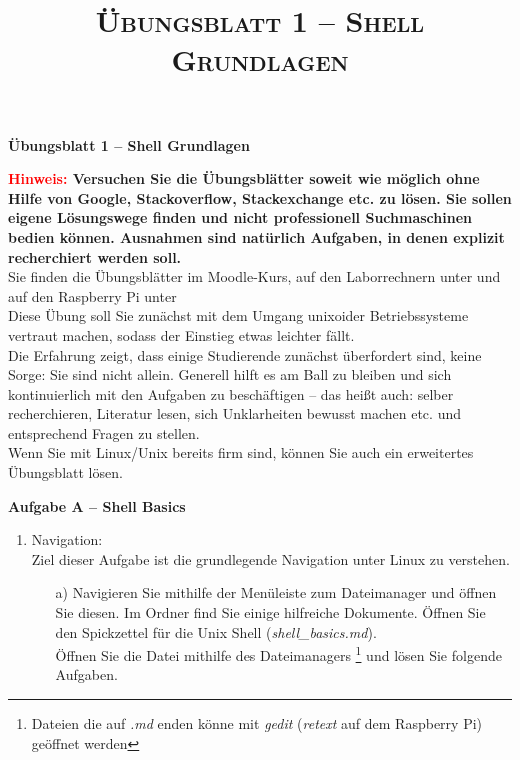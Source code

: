 \documentclass[paper=a4,fontsize=11pt]{scrartcl}%
\title{	
\normalfont \normalsize 
\textsc{Übungsblatt 1 -- Shell Grundlagen}
}
\numberwithin{equation}{section}
\begin{document}
\begin{center}
\Large{\textbf{Übungsblatt 1 -- Shell Grundlagen}}
\end{center}
\large{\textbf{\textcolor{red}{Hinweis:} Versuchen Sie die Übungsblätter soweit wie möglich ohne Hilfe von Google, Stackoverflow, Stackexchange etc. zu lösen. Sie sollen eigene Lösungswege finden und nicht professionell Suchmaschinen bedien können. Ausnahmen sind natürlich Aufgaben, in denen explizit recherchiert werden soll.}\\
\linebreak[4]
Sie finden die Übungsblätter im Moodle-Kurs, auf den Laborrechnern unter  und auf den Rasp\-berry Pi unter \\
\linebreak[4]
Diese Übung soll Sie zunächst mit dem Umgang unixoider Betriebssysteme vertraut machen, sodass der Einstieg etwas leichter fällt.\\
Die Erfahrung zeigt, dass einige Studierende zunächst überfordert sind, keine Sorge: Sie sind nicht allein. Generell hilft es am Ball zu bleiben und sich kontinuierlich mit den Aufgaben zu beschäftigen -- das heißt auch: selber recherchieren, Literatur lesen, sich Unklarheiten bewusst machen etc. und entsprechend Fragen zu stellen.\\
Wenn Sie mit Linux/Unix bereits firm sind, können Sie auch ein erweitertes Übungsblatt lösen.
\begin{center}\Large{\textbf{Aufgabe A -- Shell Basics}}\end{center}\vskip0.25in
\begin{enumerate}
\item Navigation:\\
Ziel dieser Aufgabe ist die grundlegende Navigation unter Linux zu verstehen.
	\begin{itemize}
		\item[a)] Navigieren Sie mithilfe der Menüleiste zum Dateimanager und öffnen Sie diesen. Im Ordner  find Sie einige hilfreiche Dokumente. Öffnen Sie den Spickzettel für die Unix Shell (\emph{shell\_basics.md}).\\
Öffnen Sie die Datei mithilfe des Dateimanagers \footnote{Dateien die auf \emph{.md} enden könne mit \emph{gedit} (\emph{retext} auf dem Raspberry Pi) geöffnet werden} und lösen Sie folgende Aufgaben.\\

\end{itemize}
\end{enumerate}}
\end{document}
